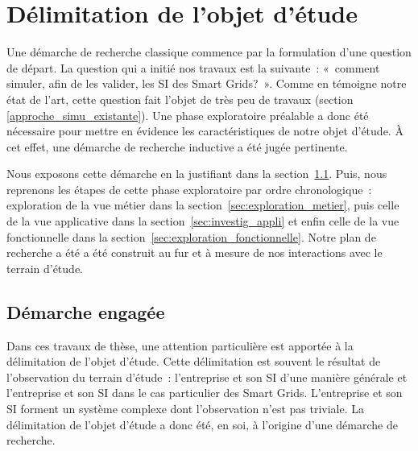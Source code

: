 \chapter{Délimitation de l'objet d'étude}
\label{ch:methodo}

\PartialToc


Une démarche de recherche classique commence par la formulation d'une question 
de départ. La question qui a initié nos travaux est la suivante~: «~comment 
simuler, afin de les valider, les SI des Smart Grids?~».  Comme en témoigne notre 
état de l'art, cette question fait l'objet de très peu de travaux (section 
\ref{approche_simu_existante}). Une phase exploratoire préalable a donc été nécessaire 
pour mettre en évidence les caractéristiques de notre objet d'étude. À cet effet,
une démarche de recherche inductive a été jugée pertinente.

Nous exposons cette démarche en la justifiant dans la section~\ref{sec:demarche_objet_etude}.
Puis, nous reprenons les étapes de cette phase exploratoire 
par ordre chronologique~: exploration de la vue métier dans la section~\ref{sec:exploration_metier}, puis celle de la vue 
applicative dans la section~\ref{sec:investig_appli} et enfin celle de la vue fonctionnelle dans 
la section~\ref{sec:exploration_fonctionnelle}.
Notre plan de recherche a été 
a été 
construit au fur et à mesure de nos interactions avec le terrain d'étude. 








\section{Démarche engagée}
\label{sec:demarche_objet_etude}
		
Dans ces travaux de thèse, une attention particulière est apportée à la délimitation de l'objet d'étude. 
Cette délimitation est souvent le résultat de l'observation du terrain d'étude~: 
l'entreprise et son SI d'une manière générale et l'entreprise et son SI dans le 
cas particulier des Smart Grids. L'entreprise et son SI forment un système 
complexe dont l'observation n'est pas triviale. La délimitation de l'objet 
d'étude a donc été, en soi, à l'origine d'une démarche de recherche.

